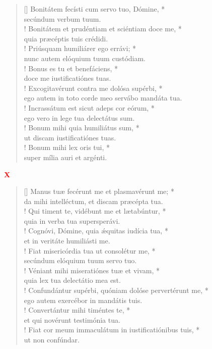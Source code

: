 \begin{verse}[\versewidth]
Bonitátem fecísti cum servo tuo, Dómine, *\\
secúndum verbum tuum.\\!
\vin Bonitátem et prudéntiam et sciéntiam doce me, *\\
\vin quia præcéptis tuis crédidi.\\!
Priúsquam humiliárer ego errávi; *\\
nunc autem elóquium tuum custódiam.\\!
\vin Bonus es tu et benefáciens, *\\
\vin doce me iustificatiónes tuas.\\!
Excogitavérunt contra me dolósa supérbi, *\\
ego autem in toto corde meo servábo mandáta tua.\\!
\vin Incrassátum est sicut adeps cor eórum, *\\
\vin ego vero in lege tua delectátus sum.\\!
Bonum mihi quia humiliátus sum, *\\
ut discam iustificatiónes tuas.\\!
\vin Bonum mihi lex oris tui, *\\
\vin super mília auri et argénti.\\
\end{verse}
\begin{center}
\textcolor{red}{\bf X}\\
\end{center}
\begin{verse}[\versewidth]
Manus tuæ fecérunt me et plasmavérunt me; *\\
da mihi intelléctum, et discam præcépta tua.\\!
\vin Qui timent te, vidébunt me et lætabúntur, *\\
\vin quia in verba tua supersperávi.\\!
Cognóvi, Dómine, quia \'{æ}quitas iudícia tua, *\\
et in veritáte humiliásti me.\\!
\vin Fiat misericórdia tua ut consolétur me, *\\
\vin secúndum elóquium tuum servo tuo.\\!
Véniant mihi miseratiónes tuæ et vivam, *\\
quia lex tua delectátio mea est.\\!
\vin Confundántur supérbi, quóniam dolóse pervertérunt me, *\\
\vin ego autem exercébor in mandátis tuis.\\!
Convertántur mihi timéntes te, *\\
et qui novérunt testimónia tua.\\!
\vin Fiat cor meum immaculátum in iustificatiónibus tuis, *\\
\vin ut non confúndar.\\
\end{verse}
\vspace{1cm}


